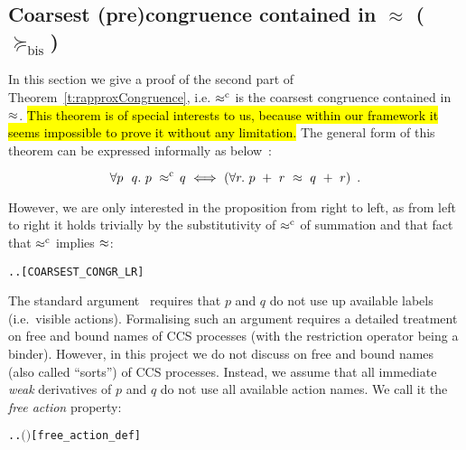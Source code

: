 
\subsection{Coarsest (pre)congruence contained in $\approx$ ($\succeq_{\mathrm{bis}}$)}
\label{s:coarsest}

In this section we give a proof of the second part of
Theorem~\ref{t:rapproxCongruence}, i.e. $\mathrel{\approx^{\rm{c}}}$ is the coarsest
congruence contained in $\approx$. \hl{This theorem is of special interests to
us, because within our framework it seems impossible to prove it
without any limitation.} The general form of this theorem can be
expressed informally as below~\cite{van2005characterisation,Gorrieri:2015jt,Mil89}:
\begin{proposition}
\label{prop:coarsest}
\begin{equation}
\forall p\ \ q.\ p\ \rapprox\ \! q\ \Longleftrightarrow\ ( \forall r.\ p\ +\
r\ \approx\ q\ +\ r )\enspace.
\end{equation}
\end{proposition}

However, we are only interested in the proposition from right to left,
as from left to right it holds trivially by the substitutivity of
$\mathrel{\approx^{\rm{c}}}$ of summation and that fact that $\mathrel{\approx^{\rm{c}}}$ implies $\approx$:
\begin{alltt}
\HOLTokenTurnstile{} \HOLSymConst{\HOLTokenForall{}} .  \HOLSymConst{\HOLTokenObsCongr}  \HOLSymConst{\HOLTokenImp{}} \HOLSymConst{\HOLTokenForall{}}.  \HOLSymConst{\ensuremath{+}}  \HOLSymConst{\HOLTokenWeakEQ}  \HOLSymConst{\ensuremath{+}} \hfill{[COARSEST_CONGR_LR]}
\end{alltt}

The standard argument~\cite{Mil89} requires that $p$
and $q$ do not use up available labels (i.e.~visible actions).
Formalising such an argument requires  
a detailed treatment on free and bound names of CCS
processes (with the restriction operator being a binder).
However, in this project we do not discuss on free and bound names
(also called ``sorts'') of CCS processes. Instead, we
assume that all immediate \emph{weak} derivatives of
 $p$ and $q$ do not use all available action names. We call it
 the \emph{free action} property:
\begin{alltt}
     \HOLSymConst{\HOLTokenDefEquality{}} \HOLSymConst{\HOLTokenExists{}}. \HOLSymConst{\HOLTokenForall{}}. \HOLSymConst{\HOLTokenNeg{}}\ensuremath{(} \HOLTokenWeakTransBegin{} \HOLTokenWeakTransEnd {}\ensuremath{)}\hfill{[free_action_def]}
\end{alltt}

